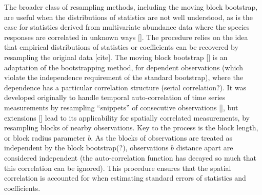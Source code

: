 \documentclass[a4paper,12pt]{article}
\begin{document}
The broader class of resampling methods, including the moving block bootstrap, are useful when the distributions of statistics are not well understood, as is the case for statistics derived from multivariate abundance data where the species responses are correlated in unknown ways []. 
The procedure relies on the idea that empirical distributions of statistics or coefficients can be recovered by resampling the original data [cite].
The moving block bootstrap [] is an adaptation of the bootstrapping method, for dependent observations (which violate the independence requirement of the standard bootstrap), where the dependence has a particular correlation structure (serial correlation?). It was developed originally to handle temporal auto-correlation of time series measurements by resampling “snippets” of consecutive observations [], but extensions [] lead to its applicability for spatially correlated measurements, by resampling blocks of nearby observations. Key to the process is the block length, or block radius parameter $b$. As the blocks of observations are treated as independent by the block bootstrap(?), observations $b$ distance apart are considered independent (the auto-correlation function has decayed so much that this correlation can be ignored). This procedure ensures that the spatial correlation is accounted for when estimating standard errors of statistics and coefficients.
\end{document}
